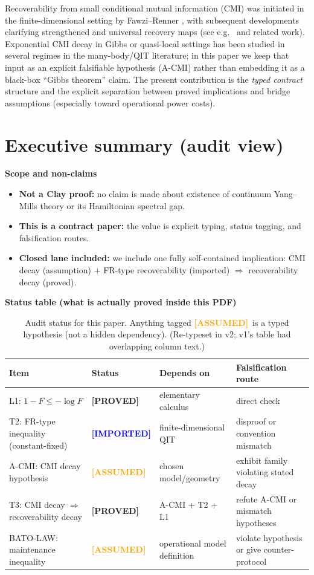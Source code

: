 \documentclass[11pt]{article}
\theoremstyle{definition}
\theoremstyle{remark}
\newcommand{\ASSUMED}{\textcolor{orange}{\textbf{[ASSUMED]}}}
\newcommand{\PROVED}{\textcolor{green!60!black}{\textbf{[PROVED]}}}
\newcommand{\IMPORTED}{\textcolor{blue}{\textbf{[IMPORTED]}}}
\begin{document}
Recoverability from small conditional mutual information (CMI) was
initiated in the finite-dimensional setting by Fawzi--Renner \cite{FR},
with subsequent developments clarifying strengthened and universal
recovery maps (see e.g.\ \cite{STH} and related work). Exponential CMI
decay in Gibbs or quasi-local settings has been studied in several
regimes in the many-body/QIT literature; in this paper we keep that
input as an explicit falsifiable hypothesis (A-CMI) rather than
embedding it as a black-box ``Gibbs theorem'' claim. The present
contribution is the \emph{typed contract} structure and the explicit
separation between proved implications and bridge assumptions
(especially toward operational power costs).

\section{Executive summary (audit view)}

\textbf{Scope and non-claims}
\begin{itemize}
\item \textbf{Not a Clay proof:} no claim is made about existence of
continuum Yang--Mills theory or its Hamiltonian spectral gap.
\item \textbf{This is a contract paper:} the value is explicit typing,
status tagging, and falsification routes.
\item \textbf{Closed lane included:} we include one fully
self-contained implication: CMI decay (assumption) $+$ FR-type
recoverability (imported) $\Rightarrow$ recoverability decay (proved).
\end{itemize}

\textbf{Status table (what is actually proved inside this PDF)}

\begin{table}[h!]
\centering
\begin{tabular}{p{3.4cm} p{2.4cm} p{3.6cm} p{4.4cm}}
\hline
\textbf{Item} & \textbf{Status} & \textbf{Depends on} &
\textbf{Falsification route} \\
\hline
L1: $1 - F \le -\log F$ & \PROVED & elementary calculus & direct check
\\
T2: FR-type inequality (constant-fixed) & \IMPORTED & finite-dimensional
QIT & disproof or convention mismatch \\
A-CMI: CMI decay hypothesis & \ASSUMED & chosen model/geometry & exhibit
family violating stated decay \\
T3: CMI decay $\Rightarrow$ recoverability decay & \PROVED & A-CMI $+$
T2 $+$ L1 & refute A-CMI or mismatch hypotheses \\
BATO-LAW: maintenance inequality & \ASSUMED & operational model
definition & violate hypothesis or give counter-protocol \\
\hline
\end{tabular}
\caption{Audit status for this paper. Anything tagged \ASSUMED\ is a
typed hypothesis (not a hidden dependency). (Re-typeset in v2; v1's
table had overlapping column text.)}
\label{tab:audit}
\end{table}
\end{document}

